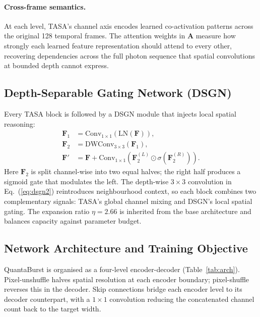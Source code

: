 \documentclass[10pt,twocolumn,letterpaper]{article}
\newcommand{\bF}{\mathbf{F}}
\newcommand{\bA}{\mathbf{A}}
\begin{document}
\paragraph{Cross-frame semantics.}
At each level, TASA's channel axis encodes learned co-activation
patterns across the original 128 temporal frames.
The attention weights in $\bA$ measure how strongly each
learned feature representation should attend to every other,
recovering dependencies across the full photon sequence
that spatial convolutions at bounded depth cannot express.

\subsection{Depth-Separable Gating Network (DSGN)}

Every TASA block is followed by a DSGN module that injects
local spatial reasoning:
\begin{align}
  \bF_1 &= \mathrm{Conv}_{1\times1}(\mathrm{LN}(\bF)),
  \label{eq:dsgn1}\\
  \bF_2 &= \mathrm{DWConv}_{3\times3}(\bF_1),
  \label{eq:dsgn2}\\
  \bF'  &= \bF + \mathrm{Conv}_{1\times1}\!\left(
    \bF_2^{(L)}\odot\sigma\!\left(\bF_2^{(R)}\right)
  \right).
  \label{eq:dsgn3}
\end{align}
Here $\bF_2$ is split channel-wise into two equal halves;
the right half produces a sigmoid gate that modulates the left.
The depth-wise $3{\times}3$ convolution in Eq.~(\ref{eq:dsgn2})
reintroduces neighbourhood context, so each block combines
two complementary signals: TASA's global channel mixing and
DSGN's local spatial gating.
The expansion ratio $\eta{=}2.66$ is inherited from the base
architecture and balances capacity against parameter budget.

\subsection{Network Architecture and Training Objective}

QuantaBurst is organised as a four-level encoder-decoder
(Table~\ref{tab:arch}).
Pixel-unshuffle halves spatial resolution at each encoder
boundary; pixel-shuffle reverses this in the decoder.
Skip connections bridge each encoder level to its decoder
counterpart, with a $1{\times}1$ convolution reducing the
concatenated channel count back to the target width.
\end{document}
